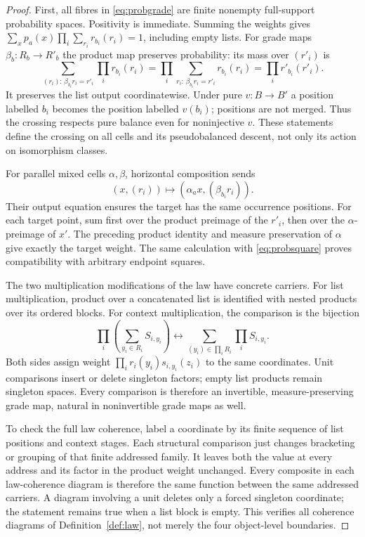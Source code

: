\documentclass[11pt]{article}
\theoremstyle{definition}
\begin{document}
\begin{proof}
First, all fibres in \eqref{eq:probgrade} are finite nonempty full-support
probability spaces. Positivity is immediate. Summing the weights gives
$\sum_xp_a(x)\prod_i\sum_{r_i}r_{b_i}(r_i)=1$, including empty lists.
For grade maps $\beta_b:R_b\to R'_b$ the product map preserves probability:
its mass over $(r'_i)$ is
\[
 \sum_{(r_i):\,\beta_{b_i}r_i=r'_i}\prod_i r_{b_i}(r_i)
 =\prod_i\sum_{r_i:\,\beta_{b_i}r_i=r'_i}r_{b_i}(r_i)
 =\prod_i r'_{b_i}(r'_i).
\]
It preserves the list output coordinatewise. Under pure $v:B\to B'$ a
position labelled $b_i$ becomes the position labelled $v(b_i)$; positions
are not merged. Thus the crossing respects pure balance even for
noninjective $v$. These statements define the crossing on all cells and its
pseudobalanced descent, not only its action on isomorphism classes.

For parallel mixed cells $\alpha,\beta$, horizontal composition sends
\[
 (x,(r_i))\longmapsto(\alpha_a x,(\beta_{b_i}r_i)).
\]
Their output equation ensures the target has the same occurrence positions.
For each target point, sum first over the product preimage of the $r'_i$,
then over the $\alpha$-preimage of $x'$. The preceding product identity and
measure preservation of $\alpha$ give exactly the target weight. The same
calculation with \eqref{eq:probsquare} proves compatibility with arbitrary
endpoint squares.

The two multiplication modifications of the law have concrete carriers.
For list multiplication, product over a concatenated list is identified
with nested products over its ordered blocks. For context multiplication,
the comparison is the bijection
\begin{equation}\label{eq:probdistrib}
 \prod_i\left(\sum_{y_i\in R_i}S_{i,y_i}\right)
 \longleftrightarrow
 \sum_{(y_i)\in\prod_iR_i}\prod_iS_{i,y_i}.
\end{equation}
Both sides assign weight $\prod_i r_i(y_i)s_{i,y_i}(z_i)$ to the same
coordinates. Unit comparisons insert or delete singleton factors; empty
list products remain singleton spaces. Every comparison is therefore an
invertible, measure-preserving grade map, natural in noninvertible grade
maps as well.

To check the full law coherence, label a coordinate by its finite sequence
of list positions and context stages. Each structural comparison just
changes bracketing or grouping of that finite addressed family. It leaves
both the value at every address and its factor in the product weight
unchanged. Every composite in each law-coherence diagram is therefore the
same function between the same addressed carriers. A diagram involving a
unit deletes only a forced singleton coordinate; the statement remains
true when a list block is empty. This verifies all coherence diagrams of
Definition~\ref{def:law}, not merely the four object-level boundaries.


\end{proof}
\end{document}
